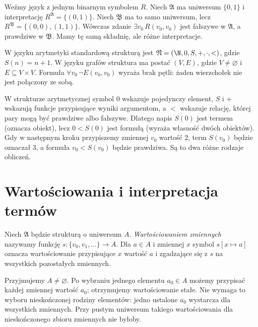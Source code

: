 \begin{przyklad}
Weźmy język z jednym binarnym symbolem $R$.
Niech $\mathfrak A$ ma uniwersum $\{0,1\}$ i interpretację
$R^{\mathfrak A}=\{(0,1)\}$.
Niech $\mathfrak B$ ma to samo uniwersum, lecz
$R^{\mathfrak B}=\{(0,0),(1,1)\}$.
Wówczas zdanie $\exists v_0\,R(v_0,v_0)$ jest fałszywe
w $\mathfrak A$, a prawdziwe w $\mathfrak B$.
Mamy tę samą składnię, ale różne interpretacje.
\end{przyklad}
\begin{przyklad}
W języku arytmetyki standardową strukturą jest
$\mathfrak N=(\N,0,S,+,\cdot,<)$, gdzie $S(n)=n+1$.
W języku grafów struktura ma postać $(V,E)$, gdzie $V\ne\varnothing$
i $E\subseteq V\times V$. Formuła $\forall v_0\,\neg E(v_0,v_0)$
wyraża brak pętli: żaden wierzchołek nie jest połączony ze sobą.
\end{przyklad}


\begin{uwaga}
W strukturze arytmetycznej symbol $0$ wskazuje pojedynczy element,
$S$ i $+$ wskazują funkcje przypisujące wyniki argumentom,
a $<$ wskazuje relację, której pary mogą być prawdziwe albo fałszywe.
Dlatego napis $S(0)$ jest termem (oznacza obiekt), lecz $0<S(0)$
jest formułą (wyraża własność dwóch obiektów).
Gdy w następnym kroku przypiszemy zmiennej $v_0$ wartość $2$,
term $S(v_0)$ będzie oznaczał $3$, a formuła $v_0<S(v_0)$
będzie prawdziwa. Są to dwa różne rodzaje obliczeń.
\end{uwaga}

\section{Wartościowania i interpretacja termów}
\begin{definicja}[Wartościowanie]\label{def:sem-assignment}
Niech $\mathfrak A$ będzie strukturą o uniwersum $A$.
\emph{Wartościowaniem zmiennych} nazywamy funkcję
$s:\{v_0,v_1,\ldots\}\to A$.
Dla $a\in A$ i zmiennej $x$ symbol $s[x\mapsto a]$
oznacza wartościowanie przypisujące $x$ wartość $a$ i zgadzające
się z $s$ na wszystkich pozostałych zmiennych.
\end{definicja}
\begin{uwaga}
Przyjmujemy $A\ne\varnothing$. Po wybraniu jednego
elementu $a_0\in A$ możemy przypisać każdej zmiennej
wartość $a_0$; otrzymujemy wartościowanie stałe.
Nie wymaga to wyboru nieskończonej rodziny elementów:
jedno ustalone $a_0$ wystarcza dla wszystkich zmiennych.
Przy pustym uniwersum takiego wartościowania dla
nieskończonego zbioru zmiennych nie byłoby.
\end{uwaga}

